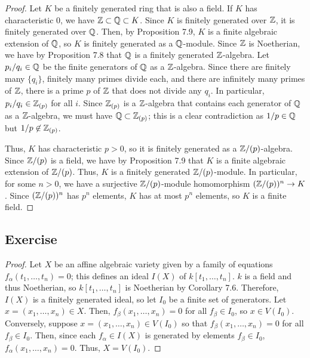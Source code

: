 \begin{proof}
Let $K$ be a finitely generated ring that is also a field. If $K$ has characteristic $0$, we have $\mathbb{Z} \subset \mathbb{Q} \subset K$. Since $K$ is finitely generated over $\mathbb{Z}$,
it is finitely generated over $\mathbb{Q}$. Then, by Proposition 7.9, $K$ is a finite algebraic extension of $\mathbb{Q}$, so $K$ is finitely generated as a $\mathbb{Q}$-module. Since $\mathbb{Z}$ is
Noetherian, we have by Proposition 7.8 that $\mathbb{Q}$ is a finitely generated $\mathbb{Z}$-algebra. Let $p_i/q_i \in \mathbb{Q}$ be the finite generators of $\mathbb{Q}$ as a $\mathbb{Z}$-algebra. Since there
are finitely many $\{q_i\}$, finitely many primes divide each, and there are infinitely many primes of $\mathbb{Z}$, there is a prime $p$ of $\mathbb{Z}$ that does not divide any $q_i$.
In particular, $p_i/q_i \in \mathbb{Z}_{(p)}$ for all $i$. Since $\mathbb{Z}_{(p)}$ is a $\mathbb{Z}$-algebra that contains each generator of $\mathbb{Q}$ as a $\mathbb{Z}$-algebra, we must have
$\mathbb{Q} \subset \mathbb{Z}_{(p)}$; this is a clear contradiction as $1/p \in \mathbb{Q}$ but $1/p \not\in \mathbb{Z}_{(p)}$.

Thus, $K$ has characteristic $p > 0$, so it is finitely generated as a $\mathbb{Z}/(p)$-algebra. Since $\mathbb{Z}/(p)$ is a field, we have by Proposition 7.9 that $K$ is a finite algebraic
extension of $\mathbb{Z}/(p)$. Thus, $K$ is a finitely generated $\mathbb{Z}/(p)$-module. In particular, for some $n > 0$, we have a surjective $\mathbb{Z}/(p)$-module homomorphism $(\mathbb{Z}/(p))^n \to K$.
Since $(\mathbb{Z}/(p))^n$ has $p^n$ elements, $K$ has at most $p^n$ elements, so $K$ is a finite field.
\end{proof}

\subsection{Exercise}\label{7.7}

\begin{proof}
Let $X$ be an affine algebraic variety given by a family of equations $f_{\alpha}(t_1,\ldots,t_n) = 0$; this defines an ideal $I(X)$ of $k[t_1,\ldots,t_n]$. 
$k$ is a field and thus Noetherian, so $k[t_1,\ldots,t_n]$ is Noetherian by Corollary 7.6. Therefore, $I(X)$ is a finitely
generated ideal, so let $I_0$ be a finite set of generators. Let $x = (x_1,\ldots,x_n) \in X$. Then, $f_{\beta}(x_1,\ldots,x_n) = 0$ for all $f_{\beta} \in I_0$,
so $x \in V(I_0)$. Conversely, suppose $x = (x_1,\ldots,x_n) \in V(I_0)$ so that $f_{\beta}(x_1,\ldots,x_n) = 0$ for all $f_{\beta} \in I_0$. 
Then, since each $f_{\alpha} \in I(X)$ is generated by elements $f_{\beta} \in I_0$, $f_{\alpha}(x_1,\ldots,x_n) = 0$. Thus, $X = V(I_0)$.
\end{proof}

